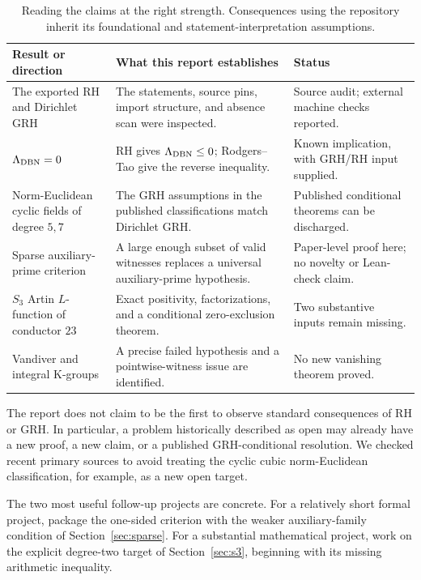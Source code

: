 \documentclass[11pt,letterpaper]{article}
\theoremstyle{definition}
\theoremstyle{remark}
\begin{document}
\begin{table}[ht]
\centering\small
\begin{tabularx}{\textwidth}{@{}p{}Yp{0.25\textwidth}@{}}
\toprule
Result or direction & What this report establishes & Status\\
\midrule
The exported RH and Dirichlet GRH & The statements, source pins, import
structure, and absence scan were inspected. & Source audit; external machine
checks reported.\\
\(\Lambda_{\rm DBN}=0\) & RH gives \(\Lambda_{\rm DBN}\le0\); Rodgers--Tao
give the reverse inequality. & Known implication, with GRH/RH input supplied.\\
Norm-Euclidean cyclic fields of degree \(5,7\) & The GRH assumptions in the
published classifications match Dirichlet GRH. & Published conditional
theorems can be discharged.\\
Sparse auxiliary-prime criterion & A large enough subset of valid witnesses
replaces a universal auxiliary-prime hypothesis. & Paper-level proof here;
no novelty or Lean-check claim.\\
\(S_3\) Artin \(L\)-function of conductor \(23\) & Exact positivity,
factorizations, and a conditional zero-exclusion theorem. & Two substantive
inputs remain missing.\\
Vandiver and integral K-groups & A precise failed hypothesis and a
pointwise-witness issue are identified. & No new vanishing theorem proved.\\
\bottomrule
\end{tabularx}
\caption{Reading the claims at the right strength. Consequences using the
repository inherit its foundational and statement-interpretation assumptions.}
\end{table}

The report does not claim to be the first to observe standard consequences of
RH or GRH. In particular, a problem historically described as open may already
have a new proof, a new claim, or a published GRH-conditional resolution.
We checked recent primary sources to avoid treating the cyclic cubic
norm-Euclidean classification, for example, as a new open target.

The two most useful follow-up projects are concrete. For a relatively short
formal project, package the one-sided criterion with the weaker
auxiliary-family condition of Section~\ref{sec:sparse}. For a substantial
mathematical project, work on the explicit degree-two target of
Section~\ref{sec:s3}, beginning with its missing arithmetic inequality.
\end{document}
